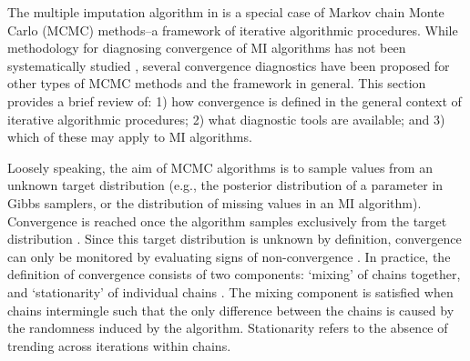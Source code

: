 \documentclass[article]{jss}
\begin{document}
The multiple imputation algorithm in  is a special case of Markov chain Monte Carlo (MCMC) methods--a framework of iterative algorithmic procedures. While methodology for diagnosing convergence of MI algorithms has not been systematically studied \citep{buur18}, several convergence diagnostics have been proposed for other types of MCMC methods and the framework in general.
This section provides a brief review of: 1) how convergence is defined in the general context of iterative algorithmic procedures; 2) what diagnostic tools are available; and 3) which of these may apply to MI algorithms. 

Loosely speaking, the aim of MCMC algorithms is to sample values from an unknown target distribution (e.g., the posterior distribution of a parameter in Gibbs samplers, or the distribution of missing values in an MI algorithm). Convergence is reached once the algorithm samples exclusively from the target distribution \citep{cowl96}. Since this target distribution is unknown by definition, convergence can only be monitored by evaluating signs of non-convergence \citep{hoff09}. In practice, the definition of convergence consists of two components: `mixing' of chains together, and `stationarity' of individual chains \citep[p.~284]{gelm13}. The mixing component is satisfied when chains intermingle such that the only difference between the chains is caused by the randomness induced by the algorithm. Stationarity refers to the absence of trending across iterations within chains. %
\end{document}
